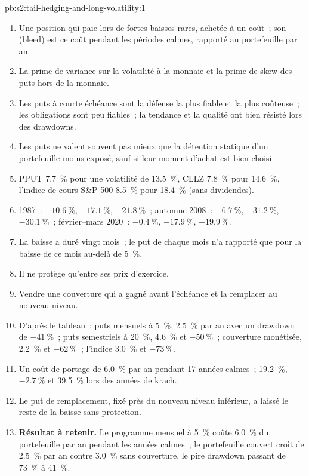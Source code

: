 \begin{solution}{pb:s2:tail-hedging-and-long-volatility:1}
\begin{enumerate}
\item Une position qui paie lors de fortes baisses rares, achetée à un coût~; son  (bleed) est ce coût pendant les périodes calmes, rapporté au portefeuille par an.
\item La prime de variance sur la volatilité à la monnaie et la prime de skew des puts hors de la monnaie.
\item Les puts à courte échéance sont la défense la plus fiable et la plus coûteuse~; les obligations sont peu fiables~; la tendance et la qualité ont bien résisté lors des drawdowns.
\item Les puts ne valent souvent pas mieux que la détention statique d'un portefeuille moins exposé, sauf si leur moment d'achat est bien choisi.
\item PPUT 7.7~\% pour une volatilité de 13.5~\%, CLLZ 7.8~\% pour 14.6~\%, l'indice de cours S\&P 500 8.5~\% pour 18.4~\% (sans dividendes).
\item 1987~: $-10.6~\%$, $-17.1~\%$, $-21.8~\%$~; automne 2008~: $-6.7~\%$, $-31.2~\%$, $-30.1~\%$~; février--mars 2020~: $-0.4~\%$, $-17.9~\%$, $-19.9~\%$.
\item La baisse a duré vingt mois~; le put de chaque mois n'a rapporté que pour la baisse de ce mois au-delà de 5~\%.
\item Il ne protège qu'entre ses prix d'exercice.
\item Vendre une couverture qui a gagné avant l'échéance et la remplacer au nouveau niveau.
\item D'après le tableau~: puts mensuels à 5~\%, 2.5~\% par an avec un drawdown de $-41~\%$~; puts semestriels à 20~\%, 4.6~\% et $-50~\%$~; couverture monétisée, 2.2~\% et $-62~\%$~;
l'indice 3.0~\% et $-73~\%$.
\item Un coût de portage de 6.0~\% par an pendant 17 années calmes~; 19.2~\%, $-2.7~\%$ et 39.5~\% lors des années de krach.
\item Le put de remplacement, fixé près du nouveau niveau inférieur, a laissé le reste de la baisse sans protection.
\item \textbf{Résultat à retenir.} Le programme mensuel à 5~\% coûte 6.0~\% du portefeuille par an pendant les années calmes~; le portefeuille couvert croît de 2.5~\% par an
contre 3.0~\% sans couverture, le pire drawdown passant de 73~\% à 41~\%.

\end{enumerate}
\end{solution}
